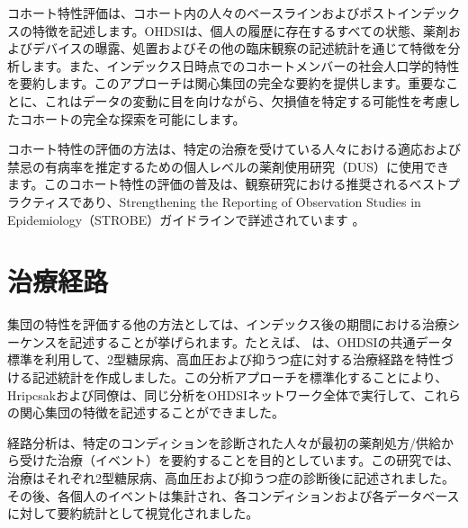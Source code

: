 \documentclass[
  11pt]{book}
\theoremstyle{definition}
\theoremstyle{definition}
\theoremstyle{definition}
\theoremstyle{definition}
\theoremstyle{remark}
\begin{document}
コホート特性評価は、コホート内の人々のベースラインおよびポストインデックスの特徴を記述します。OHDSIは、個人の履歴に存在するすべての状態、薬剤およびデバイスの曝露、処置およびその他の臨床観察の記述統計を通じて特徴を分析します。また、インデックス日時点でのコホートメンバーの社会人口学的特性を要約します。このアプローチは関心集団の完全な要約を提供します。重要なことに、これはデータの変動に目を向けながら、欠損値を特定する可能性を考慮したコホートの完全な探索を可能にします。

コホート特性の評価の方法は、特定の治療を受けている人々における適応および禁忌の有病率を推定するための個人レベルの薬剤使用研究（DUS）に使用できます。このコホート特性の評価の普及は、観察研究における推奨されるベストプラクティスであり、Strengthening the Reporting of Observation Studies in Epidemiology（STROBE）ガイドラインで詳述されています \citep{VONELM2008344}。  

\section{治療経路}\label{ux6cbbux7642ux7d4cux8def}

集団の特性を評価する他の方法としては、インデックス後の期間における治療シーケンスを記述することが挙げられます。たとえば、\citet{Hripcsak7329} は、OHDSIの共通データ標準を利用して、2型糖尿病、高血圧および抑うつ症に対する治療経路を特性づける記述統計を作成しました。この分析アプローチを標準化することにより、Hripcsakおよび同僚は、同じ分析をOHDSIネットワーク全体で実行して、これらの関心集団の特徴を記述することができました。   

経路分析は、特定のコンディションを診断された人々が最初の薬剤処方/供給から受けた治療（イベント）を要約することを目的としています。この研究では、治療はそれぞれ2型糖尿病、高血圧および抑うつ症の診断後に記述されました。その後、各個人のイベントは集計され、各コンディションおよび各データベースに対して要約統計として視覚化されました。
\end{document}
